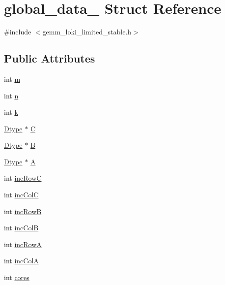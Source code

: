 \hypertarget{structglobal__data__}{}\section{global\+\_\+data\+\_\+ Struct Reference}
\label{structglobal__data__}


{\ttfamily \#include $<$gemm\+\_\+loki\+\_\+limited\+\_\+stable.\+h$>$}

\subsection*{Public Attributes}
\begin{DoxyCompactItemize}
\item 
int \hyperlink{structglobal__data___a6740cdc873f2d9912fba9fbef577ac60}{m}
\item 
int \hyperlink{structglobal__data___af3bcbc68bcda1683ba4f01d925bfe7e2}{n}
\item 
int \hyperlink{structglobal__data___ac9f5f51840a60f3c3635644adfec2a45}{k}
\item 
\hyperlink{setting_8h_a4cf883a2c584175fecfaeb45a2cd75e8}{Dtype} $\ast$ \hyperlink{structglobal__data___ae4ba970c9e094e8151f4bee44451a7e8}{C}
\item 
\hyperlink{setting_8h_a4cf883a2c584175fecfaeb45a2cd75e8}{Dtype} $\ast$ \hyperlink{structglobal__data___a4f4d4bfd8beb5e25adf33057bc56b8c9}{B}
\item 
\hyperlink{setting_8h_a4cf883a2c584175fecfaeb45a2cd75e8}{Dtype} $\ast$ \hyperlink{structglobal__data___a26183bd4c0aa27bcae35d80b2ec4ffdb}{A}
\item 
int \hyperlink{structglobal__data___ac21b0ddab00e7de031bf30c440bd6cf8}{inc\+RowC}
\item 
int \hyperlink{structglobal__data___a9fcd97d90275a85fa5796f39f1968c4d}{inc\+ColC}
\item 
int \hyperlink{structglobal__data___a94d9aea4b7f11ac9e3ee3895fdab9e9e}{inc\+RowB}
\item 
int \hyperlink{structglobal__data___af6a19d0e666f4638f295d5568834f6ef}{inc\+ColB}
\item 
int \hyperlink{structglobal__data___af80c1ce37b7da56f358c27769166ab45}{inc\+RowA}
\item 
int \hyperlink{structglobal__data___afdbb841d5c8e3ec74f10014dca629686}{inc\+ColA}
\item 
int \hyperlink{structglobal__data___ad39cc3a27438a347026cedf1b1e0c028}{cores}
\end{DoxyCompactItemize}


